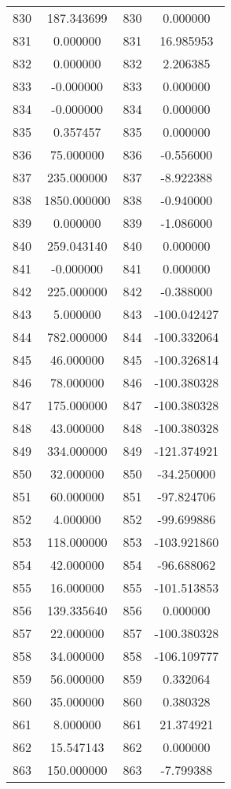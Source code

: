 \documentclass[12pt]{article}
\begin{document}
\begin{longtable}{@{}cccc@{}}
830 & 187.343699 & 830 & 0.000000 \\
831 & 0.000000 & 831 & 16.985953 \\
832 & 0.000000 & 832 & 2.206385 \\
833 & -0.000000 & 833 & 0.000000 \\
834 & -0.000000 & 834 & 0.000000 \\
835 & 0.357457 & 835 & 0.000000 \\
836 & 75.000000 & 836 & -0.556000 \\
837 & 235.000000 & 837 & -8.922388 \\
838 & 1850.000000 & 838 & -0.940000 \\
839 & 0.000000 & 839 & -1.086000 \\
840 & 259.043140 & 840 & 0.000000 \\
841 & -0.000000 & 841 & 0.000000 \\
842 & 225.000000 & 842 & -0.388000 \\
843 & 5.000000 & 843 & -100.042427 \\
844 & 782.000000 & 844 & -100.332064 \\
845 & 46.000000 & 845 & -100.326814 \\
846 & 78.000000 & 846 & -100.380328 \\
847 & 175.000000 & 847 & -100.380328 \\
848 & 43.000000 & 848 & -100.380328 \\
849 & 334.000000 & 849 & -121.374921 \\
850 & 32.000000 & 850 & -34.250000 \\
851 & 60.000000 & 851 & -97.824706 \\
852 & 4.000000 & 852 & -99.699886 \\
853 & 118.000000 & 853 & -103.921860 \\
854 & 42.000000 & 854 & -96.688062 \\
855 & 16.000000 & 855 & -101.513853 \\
856 & 139.335640 & 856 & 0.000000 \\
857 & 22.000000 & 857 & -100.380328 \\
858 & 34.000000 & 858 & -106.109777 \\
859 & 56.000000 & 859 & 0.332064 \\
860 & 35.000000 & 860 & 0.380328 \\
861 & 8.000000 & 861 & 21.374921 \\
862 & 15.547143 & 862 & 0.000000 \\
863 & 150.000000 & 863 & -7.799388 \\

\end{longtable}
\end{document}
